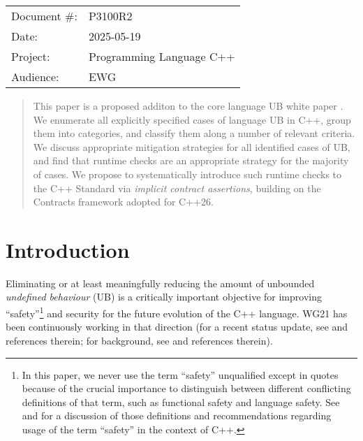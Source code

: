 \begin{tabular}{ll}
Document \#: & P3100R2 \\
Date: &2025-05-19 \\
Project: & Programming Language C++ \\
Audience: & EWG
\end{tabular}

\begin{abstract}
This paper is a proposed additon to the core language UB white paper \cite{P3656R1}. We enumerate all explicitly specified cases of language UB in C++, group them into categories, and classify them along a number of relevant criteria. We discuss appropriate mitigation strategies for all identified cases of UB, and find that runtime checks are an appropriate strategy for the majority of cases. We propose to systematically introduce such runtime checks to the C++ Standard via \emph{implicit contract assertions}, building on the Contracts framework adopted for C++26. 
\end{abstract}


\tableofcontents*
\pagebreak






\section{Introduction}
\label{intro}

Eliminating or at least meaningfully reducing the amount of unbounded \emph{undefined behaviour} (UB) is a critically important objective for improving ``safety''\footnote{In this paper, we never use the term ``safety'' unqualified except in quotes because of the crucial importance to distinguish between different conflicting definitions of that term, such as functional safety and language safety.  See \cite{P3500R1} and \cite{P3578R0} for a discussion of those definitions and recommendations regarding usage of the term ``safety'' in the context of C++.}
and security for the future evolution of the C++ language. WG21 has been continuously working in that direction (for a recent status update, see \cite{Sutter2025} and references therein; for background, see \cite{Sutter2024} and references therein).


